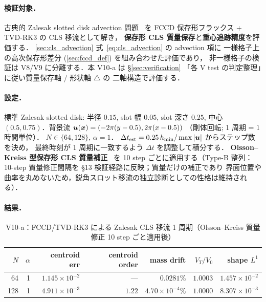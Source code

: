 \paragraph{検証対象．}
古典的 Zalesak slotted disk advection 問題~\cite{Zalesak1979} を
FCCD 保存形フラックス + TVD-RK3 の CLS 移流として解き，
\textbf{保存形 CLS 質量保存}と\textbf{重心追跡精度}を評価する．
\autoref{sec:cls_advection} 式~\eqref{eq:cls_advection} の advection 項に
一様格子上の高次保存形差分 (\autoref{sec:fccd_def}) を組み合わせた評価であり，
非一様格子の検証は V8/V9 に分離する．本 V10-a は §\ref{sec:verification}
「各 V test の判定整理」に従い質量保存軸 \checkmark / 形状軸 $\triangle$ の
二軸構造で評価する．

\paragraph{設定．}
標準 Zalesak slotted disk: 半径 $0.15$, slot 幅 $0.05$, slot 深さ $0.25$,
中心 $(0.5, 0.75)$．背景流 $\bm{u}(\bm{x}) = (-2\pi(y-0.5), 2\pi(x-0.5))$
（剛体回転; 1 周期 = $1$ 時間単位）．
$N \in \{64, 128\}$, $\alpha=1$．
$\Delta t_{\mathrm{est}} = 0.25\,h_{\min}/\max|\bm{u}|$ からステップ数を決め，
最終時刻が 1 周期に一致するよう $\Delta t$ を調整して積分する．
\textbf{Olsson--Kreiss 型保存形 CLS 質量補正}~\cite{OlssonKreiss2005}
を 10 step ごとに適用する（Type-B 整列：10-step 質量修正間隔を
§13 検証経路に反映；質量だけの補正であり
界面位置や曲率を丸めないため，鋭角スロット移流の独立診断としての性格は維持される）．

\paragraph{結果．}
\begin{table}[!htbp]
\caption{V10-a：FCCD/TVD-RK3 による Zalesak CLS 移流 1 周期（Olsson--Kreiss 質量修正 10 step ごと適用後）}
\label{tab:V10_zalesak}
\centering\small
\begin{tabular}{r r r r r r r}
\toprule
$N$ & $\alpha$ & centroid err & centroid order & mass drift & $V_T/V_0$ & shape $L^1$ \\
\midrule
64  & 1 & $1.145\times 10^{-2}$ & ---    & $0.0281\%$    & $1.0003$ & $1.457\times 10^{-2}$ \\
128 & 1 & $4.911\times 10^{-3}$ & $1.22$ & $4.70\times 10^{-4}\%$ & $1.0000$ & $8.307\times 10^{-3}$ \\
\bottomrule
\end{tabular}
\end{table}

